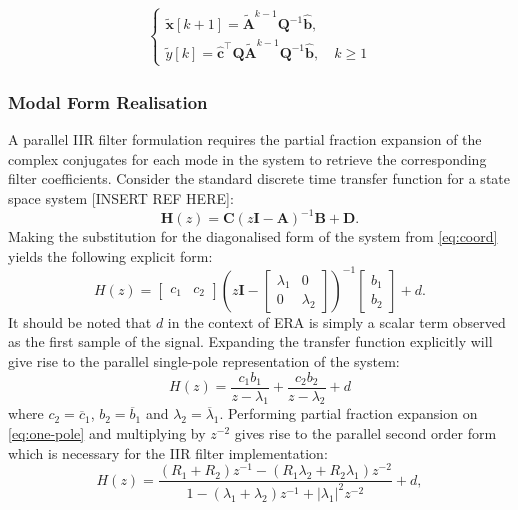 \begin{align}
\label{eq:markov-again}
\begin{cases}
    \mathbf{\tilde{x}}[k + 1] =  \tilde{\mathbf{A}}^{k-1} \mathbf{Q}^{-1} \hat{\mathbf{b}}, \\
    \tilde{y}[k] =  \hat{\mathbf{c}}^{\top} \mathbf{Q} \tilde{\mathbf{A}}^{k-1}\mathbf{Q}^{-1}\hat{\mathbf{b}}, \quad k \geq 1
\end{cases}
\end{align}

\subsubsection{Modal Form Realisation}
\label{sec:modal-form}
A parallel IIR filter formulation requires the partial fraction expansion of the complex conjugates for each mode in the system to retrieve the corresponding filter coefficients. Consider the standard discrete time transfer function for a state space system [INSERT REF HERE]:
\begin{equation}
\label{eq:ss-tf}
    \mathbf{H}(z) = \mathbf{C}(z \mathbf{I} - \mathbf{A})^{-1} \mathbf{B} + \mathbf{D}.
\end{equation}
Making the substitution for the diagonalised form of the system from \eqref{eq:coord} yields the following explicit form:
\begin{equation}
\label{eq:modal}
    H(z) = \begin{bmatrix} c_1 & c_2 \end{bmatrix} \left( z \mathbf{I} - \begin{bmatrix} \lambda_1 & 0 \\ 0 & \lambda_2 \end{bmatrix} \right)^{-1}
    \begin{bmatrix} b_1 \\ b_2 \end{bmatrix} + d.
\end{equation}
It should be noted that $d$ in the context of ERA is simply a scalar term observed as the first sample of the signal. Expanding the transfer function explicitly will give rise to the parallel single-pole representation of the system:
\begin{equation}
\label{eq:one-pole}
    H(z) = \frac{c_1 b_1}{z - \lambda_1} + \frac{c_2 b_2}{z - \lambda_2} + d
\end{equation}
where $c_2 = \overline{c}_1$, $b_2 = \overline{b}_1$ and $\lambda_2 = \overline{\lambda}_1$.
Performing partial fraction expansion on \eqref{eq:one-pole} and multiplying by $z^{-2}$ gives rise to the parallel second order form which is necessary for the IIR filter implementation:
\begin{equation}
\label{eq:second-order}
    H(z) = \frac{(R_1 + R_2)z^{-1} - (R_1 \lambda_2 + R_2 \lambda_1)z^{-2}}{1 - (\lambda_1 + \lambda_2)z^{-1} + |\lambda_1|^{2}z^{-2}} + d,
\end{equation}

